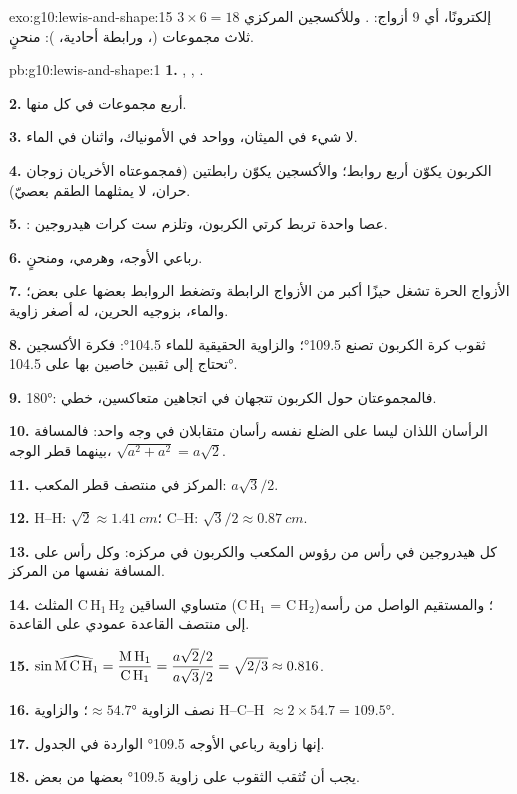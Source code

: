 \begin{solution}{exo:g10:lewis-and-shape:15}
$3 \times 6 = 18$ إلكترونًا، أي 9 أزواج:
. وللأكسجين المركزي
ثلاث مجموعات (، ورابطة أحادية، ): 
منحنٍ.
\end{solution}

\begin{solution}{pb:g10:lewis-and-shape:1}
\textbf{1.} , ,
.

\textbf{2.} أربع مجموعات في كل منها.

\textbf{3.} لا شيء في الميثان، وواحد في الأمونياك، واثنان في الماء.

\textbf{4.} الكربون يكوّن أربع روابط؛ والأكسجين يكوّن رابطتين (فمجموعتاه
الأخريان زوجان حران، لا يمثلهما الطقم بعصيّ).

\textbf{5.} : عصا واحدة تربط
كرتي الكربون، وتلزم ست كرات هيدروجين.

\textbf{6.} رباعي الأوجه، وهرمي، ومنحنٍ.

\textbf{7.} الأزواج الحرة تشغل حيزًا أكبر من الأزواج الرابطة وتضغط الروابط
بعضها على بعض؛ والماء، بزوجيه الحرين، له أصغر زاوية.

\textbf{8.} ثقوب كرة الكربون تصنع \ang{109.5}؛ والزاوية الحقيقية للماء
\ang{104.5}: فكرة الأكسجين تحتاج إلى ثقبين خاصين بها على \ang{104.5}.

\textbf{9.} \ang{180}: فالمجموعتان حول الكربون تتجهان في اتجاهين متعاكسين،
 خطي.

\textbf{10.} الرأسان اللذان ليسا على الضلع نفسه رأسان متقابلان في وجه واحد:
فالمسافة بينهما قطر الوجه، $\sqrt{a^2 + a^2} = a\sqrt{2}$.

\textbf{11.} المركز في منتصف قطر المكعب:
$a\sqrt{3}/2$.

\textbf{12.} H--H: $\sqrt{2} \approx \qty{1.41}{cm}$؛ C--H:
$\sqrt{3}/2 \approx \qty{0.87}{cm}$.

\textbf{13.} كل هيدروجين في رأس من رؤوس المكعب والكربون في مركزه: وكل رأس
على المسافة نفسها من المركز.

\textbf{14.} المثلث C\,H$_1$\,H$_2$ متساوي الساقين (C\,H$_1$ = C\,H$_2$)؛
والمستقيم الواصل من رأسه إلى منتصف القاعدة عمودي على
القاعدة.

\textbf{15.} $\sin \widehat{\text{M\,C\,H}_1} = \dfrac{\text{M\,H}_1}{\text{C\,H}_1}
= \dfrac{a\sqrt{2}/2}{a\sqrt{3}/2} = \sqrt{2/3} \approx 0.816$.

\textbf{16.} نصف الزاوية $\approx \ang{54.7}$؛ والزاوية H--C--H $\approx
2 \times 54.7 = \ang{109.5}$.

\textbf{17.} إنها زاوية رباعي الأوجه \ang{109.5} الواردة في الجدول.

\textbf{18.} يجب أن تُثقب الثقوب على زاوية \ang{109.5} بعضها من بعض.
\end{solution}
